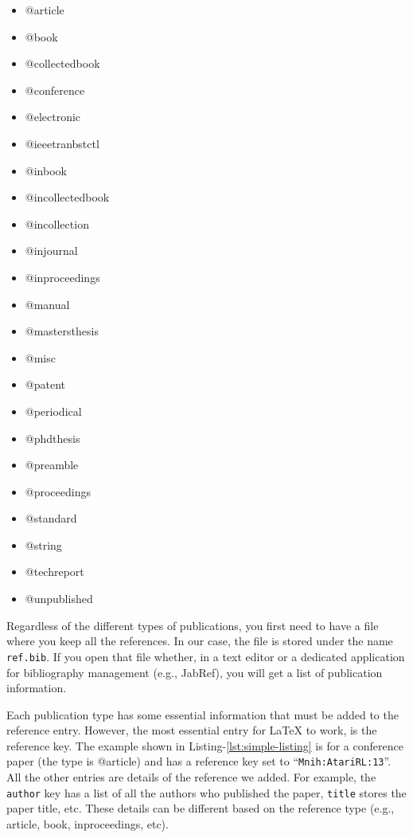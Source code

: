 \begin{itemize}
    \item @article
    \item @book
    \item @collectedbook
    \item @conference
    \item @electronic
    \item @ieeetranbstctl
    \item @inbook
    \item @incollectedbook
    \item @incollection
    \item @injournal
    \item @inproceedings
    \item @manual
    \item @mastersthesis
    \item @misc
    \item @patent
    \item @periodical
    \item @phdthesis
    \item @preamble
    \item @proceedings
    \item @standard
    \item @string
    \item @techreport
    \item @unpublished
\end{itemize}

Regardless of the different types of publications, you first need to have a file where you keep all the references. In our case, the file is stored under the name \texttt{ref.bib}. If you open that file whether, in a text editor or a dedicated application for bibliography management (e.g., JabRef), you will get a list of publication information.

Each publication type has some essential information that must be added to the reference entry. However, the most essential entry for {\LaTeX} to work, is the reference key. The example shown in Listing-\ref{lst:simple-listing} is for a conference paper (the type is @article) and has a reference key set to ``\texttt{Mnih:AtariRL:13}''. All the other entries are details of the reference we added. For example, the \verb|author| key has a list of all the authors who published the paper, \verb|title| stores the paper title, etc. These details can be different based on the reference type (e.g., article, book, inproceedings, etc).

